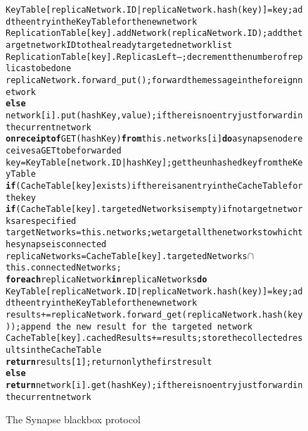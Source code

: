 \begin{figure*}[!t]
{\begin{alltt}
\AL    KeyTable[replicaNetwork.ID|replicaNetwork.hash(key)] = key;\hfill{\rm add the entry in the Key Table for the new network}
\AL    ReplicationTable[key].addNetwork(replicaNetwork.ID);\hfill{\rm add the target network ID to the already targeted network list}
\AL    ReplicationTable[key].ReplicasLeft--; \hfill{\rm decrement the number of replicas to be done}
\AL    replicaNetwork.forward_put(); \hfill{\rm forward the message in the foreign network}
\AL \textbf{else}
\AL  network[i].put(hashKey,value); \hfill{\rm if there is no entry just forward in the current network}
\NA
\AL \textbf{on receipt of} GET(hashKey) \textbf{from} this.networks[i] \textbf{do}\hfill{\rm a synapse node receives a GET to be forwarded}
\AL key = KeyTable[network.ID|hashKey]; \hfill{\rm get the unhashed key from the Key Table}
\AL \textbf{if} (CacheTable[key] exists) \hfill{\rm if there is an entry in the Cache Table for the key}
\AL  \textbf{if} (CacheTable[key].targetedNetworks is empty) \hfill{\rm if no target networks are specified}
\AL   targetNetworks  = this.networks; \hfill{\rm we target all the networks to which the synapse is connected}
\AL   replicaNetworks = CacheTable[key].targetedNetworks \(\cap\) this.connectedNetworks; 
\AL  \textbf{for each} replicaNetwork \textbf{in} replicaNetworks \textbf{do}
\AL   KeyTable[replicaNetwork.ID|replicaNetwork.hash(key)] = key; \hfill{\rm add the entry in the Key Table for the new network}
\AL   results += replicaNetwork.forward_get(replicaNetwork.hash(key));\hfill{\rm\!append\,the\,new\,result\,for\,the\,targeted\,network}
\AL  CacheTable[key].cachedResults += results; \hfill{\rm store the collected results in the Cache Table}
\AL  \textbf{return} results[1]; \hfill{\rm return only the first result}
\AL \textbf{else}
\AL  \textbf{return} network[i].get(hashKey); \hfill{\rm if there is no entry just forward in the current network}
\end{alltt}}
\caption{The Synapse blackbox protocol \label{fig:lookupBB}}
\end{figure*}


